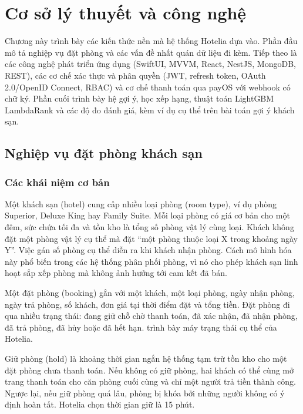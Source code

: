\chapter{Cơ sở lý thuyết và công nghệ}\label{chap:theory}

Chương này trình bày các kiến thức nền mà hệ thống Hotelia dựa vào. Phần đầu mô tả nghiệp vụ đặt phòng và các vấn đề nhất quán dữ liệu đi kèm. Tiếp theo là các công nghệ phát triển ứng dụng (SwiftUI, MVVM, React, NestJS, MongoDB, REST), các cơ chế xác thực và phân quyền (JWT, refresh token, OAuth 2.0/OpenID Connect, RBAC) và cơ chế thanh toán qua payOS với webhook có chữ ký. Phần cuối trình bày hệ gợi ý, học xếp hạng, thuật toán LightGBM LambdaRank và các độ đo đánh giá, kèm ví dụ cụ thể trên bài toán gợi ý khách sạn.

\section{Nghiệp vụ đặt phòng khách sạn}\label{sec:domain}

\subsection{Các khái niệm cơ bản}

Một khách sạn (hotel) cung cấp nhiều loại phòng (room type), ví dụ phòng Superior, Deluxe King hay Family Suite. Mỗi loại phòng có giá cơ bản cho một đêm, sức chứa tối đa và tồn kho là tổng số phòng vật lý cùng loại. Khách không đặt một phòng vật lý cụ thể mà đặt ``một phòng thuộc loại X trong khoảng ngày Y''. Việc gán số phòng cụ thể diễn ra khi khách nhận phòng. Cách mô hình hóa này phổ biến trong các hệ thống phân phối phòng, vì nó cho phép khách sạn linh hoạt sắp xếp phòng mà không ảnh hưởng tới cam kết đã bán.

Một đặt phòng (booking) gắn với một khách, một loại phòng, ngày nhận phòng, ngày trả phòng, số khách, đơn giá tại thời điểm đặt và tổng tiền. Đặt phòng đi qua nhiều trạng thái: đang giữ chỗ chờ thanh toán, đã xác nhận, đã nhận phòng, đã trả phòng, đã hủy hoặc đã hết hạn.  trình bày máy trạng thái cụ thể của Hotelia.

Giữ phòng (hold) là khoảng thời gian ngắn hệ thống tạm trừ tồn kho cho một đặt phòng chưa thanh toán. Nếu không có giữ phòng, hai khách có thể cùng mở trang thanh toán cho căn phòng cuối cùng và chỉ một người trả tiền thành công. Ngược lại, nếu giữ phòng quá lâu, phòng bị khóa bởi những người không có ý định hoàn tất. Hotelia chọn thời gian giữ là 15 phút.

